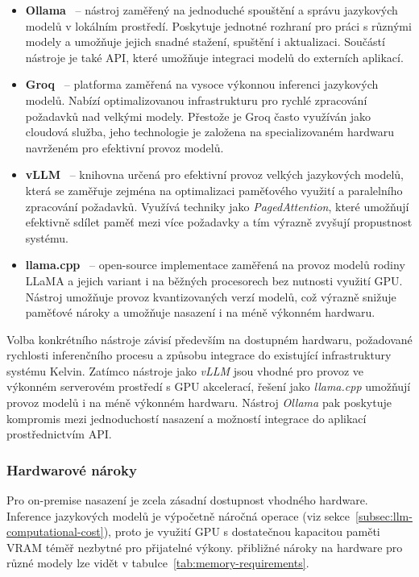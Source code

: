 \begin{itemize}
    \item \textbf{Ollama}~\cite{ollama} -- nástroj zaměřený na jednoduché spouštění a správu jazykových modelů v lokálním prostředí.
    Poskytuje jednotné rozhraní pro práci s různými modely a umožňuje jejich snadné stažení, spuštění i aktualizaci.
    Součástí nástroje je také API, které umožňuje integraci modelů do externích aplikací.

    \item \textbf{Groq}~\cite{groq} -- platforma zaměřená na vysoce výkonnou inferenci jazykových modelů.
    Nabízí optimalizovanou infrastrukturu pro rychlé zpracování požadavků nad velkými modely.
    Přestože je Groq často využíván jako cloudová služba, jeho technologie je založena na specializovaném hardwaru navrženém pro efektivní provoz modelů.

    \item \textbf{vLLM}~\cite{vllm} -- knihovna určená pro efektivní provoz velkých jazykových modelů, která se zaměřuje zejména na optimalizaci paměťového využití a paralelního zpracování požadavků.
    Využívá techniky jako \textit{PagedAttention}, které umožňují efektivně sdílet paměť mezi více požadavky a tím výrazně zvyšují propustnost systému.

    \item \textbf{llama.cpp}~\cite{llamacpp} -- open-source implementace zaměřená na provoz modelů rodiny LLaMA a jejich variant i na běžných procesorech bez nutnosti využití GPU\@.
    Nástroj umožňuje provoz kvantizovaných verzí modelů, což výrazně snižuje paměťové nároky a umožňuje nasazení i na méně výkonném hardwaru.
\end{itemize}

Volba konkrétního nástroje závisí především na dostupném hardwaru, požadované rychlosti inferenčního procesu a způsobu integrace do existující infrastruktury systému Kelvin.
Zatímco nástroje jako \textit{vLLM} jsou vhodné pro provoz ve výkonném serverovém prostředí s GPU akcelerací, řešení jako \textit{llama.cpp} umožňují provoz modelů i na méně výkonném hardwaru.
Nástroj \textit{Ollama} pak poskytuje kompromis mezi jednoduchostí nasazení a možností integrace do aplikací prostřednictvím API\@.

\subsubsection*{Hardwarové nároky}

Pro on-premise nasazení je zcela zásadní dostupnost vhodného hardware.
Inference jazykových modelů je výpočetně náročná operace (viz sekce~\ref{subsec:llm-computational-cost}), proto je využití GPU s dostatečnou kapacitou paměti VRAM téměř nezbytné pro přijatelné výkony.
přibližné nároky na hardware pro různé modely lze vidět v tabulce~\ref{tab:memory-requirements}.

